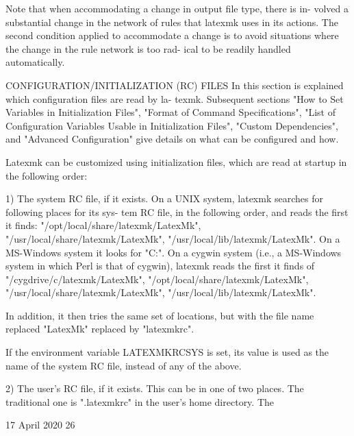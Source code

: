        Note that when accommodating a change in output file type, there is in-
       volved a substantial change in the network of rules that  latexmk  uses
       in  its  actions.  The second condition applied to accommodate a change
       is to avoid situations where the change in the rule network is too rad-
       ical to be readily handled automatically.



CONFIGURATION/INITIALIZATION (RC) FILES
       In  this section is explained which configuration files are read by la-
       texmk. Subsequent sections "How  to  Set  Variables  in  Initialization
       Files",  "Format  of  Command  Specifications",  "List of Configuration
       Variables Usable in Initialization Files", "Custom  Dependencies",  and
       "Advanced  Configuration"  give  details  on what can be configured and
       how.

       Latexmk can be customized using initialization files, which are read at
       startup in the following order:

       1) The system RC file, if it exists.
          On a UNIX system, latexmk searches for following places for its sys-
       tem RC file, in the following order, and reads the first it finds:
          "/opt/local/share/latexmk/LatexMk",
          "/usr/local/share/latexmk/LatexMk",
          "/usr/local/lib/latexmk/LatexMk".
          On a MS-Windows system it looks for "C:\latexmk\LatexMk".
          On a cygwin system (i.e., a MS-Windows system in which Perl is  that
       of cygwin), latexmk reads the first it finds of
          "/cygdrive/c/latexmk/LatexMk",
          "/opt/local/share/latexmk/LatexMk",
          "/usr/local/share/latexmk/LatexMk",
          "/usr/local/lib/latexmk/LatexMk".

       In addition, it then tries the same set of locations, but with the file
       name replaced "LatexMk" replaced by "latexmkrc".

       If the environment variable LATEXMKRCSYS is set, its value is  used  as
       the name of the system RC file, instead of any of the above.

       2) The user's RC file, if it exists.  This can be in one of two places.
       The traditional one is ".latexmkrc" in the user's home directory.   The



                                 17 April 2020                              26








